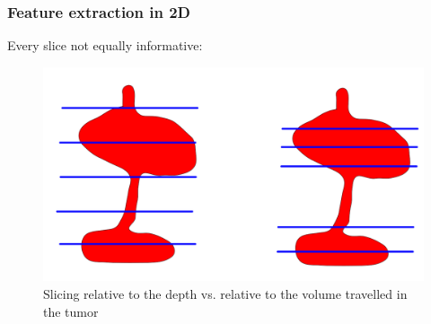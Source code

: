 \documentclass{beamer}
\begin{document}
\begin{frame}
    \frametitle{Feature extraction in 2D}
    Every slice not equally informative:
    \begin{figure}
        \centering
        \includegraphics[scale = 0.2]{images/bad_shape.png}
        \caption{Slicing relative to the depth vs. relative to the volume travelled in the tumor}
    \end{figure}
\end{frame}

\end{document}
